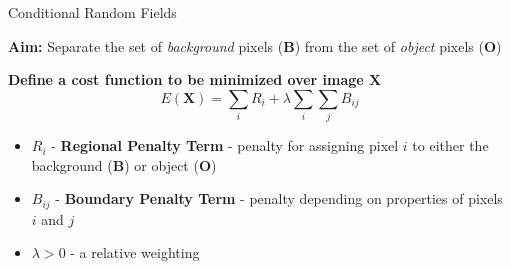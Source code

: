 \documentclass[10pt]{beamer}
\begin{document}
\begin{frame}[fragile]{Conditional Random Fields}

    \textbf{Aim:} Separate the set of \textit{background} pixels (\textbf{B}) from the set of \textit{object} pixels (\textbf{O})
  
    \textbf{Define a cost function to be minimized over image $\mathbf{X}$} \cite{graphCuts}
    \pause
    \begin{equation}
      E(\mathbf{X}) = \sum_{i} R_{i} + \lambda \sum_{i} \sum_{j} B_{ij}
      \label{eq:costFunc}
    \end{equation}

    \begin{itemize}
    \item $R_{i}$ - \textbf{Regional Penalty Term} - penalty for assigning pixel $i$ to either the background (\textbf{B}) or object (\textbf{O})
    \item $B_{ij}$ - \textbf{Boundary Penalty Term} - penalty depending on properties of pixels $i$ and $j$
    \item $\lambda > 0$ - a relative weighting
    \end{itemize}
\end{frame}
\end{document}
